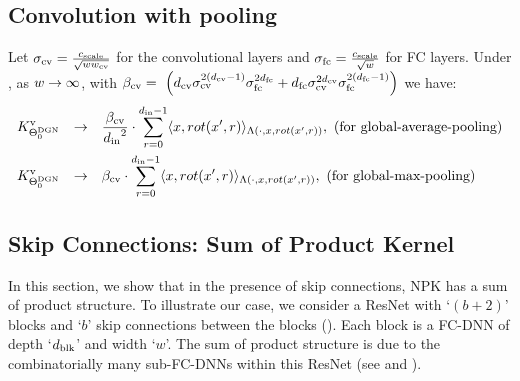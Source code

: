 \subsection{Convolution with pooling}

\begin{theorem}\label{th:mainconv} Let $\sigma_{\text{cv}}=\frac{c_{\text{scale}}}{\sqrt{ww_{\text{cv}}}}$ for the convolutional layers and $\sigma_{\text{fc}}=\frac{c_{\text{scale}}}{\sqrt{w}}$ for FC layers. Under , as $w\rightarrow\infty$, with  $\beta_{\text{cv}} = \ \left(d_{\text{cv}} \sigma_{\text{cv}}^{2(d_{\text{cv}}-1)}\sigma_{\text{fc}}^{2d_{\text{fc}}}+d_{\text{fc}} \sigma_{\text{cv}}^{2d_{\text{cv}}}\sigma_{\text{fc}}^{2(d_{\text{fc}}-1)}\right)$ we have:
\begin{align*}
&K^{\text{v}}_{\Theta^{\text{DGN}}_0}&\rightarrow&\quad \frac{\beta_{\text{cv}}}{{d_{\text{in}}}^2} \cdot \sum_{r=0}^{d_{\text{in}}-1} \langle x,rot(x',r)\rangle_{\Lambda(\cdot, x,rot(x',r))},\,\,\text{(for global-average-pooling)}\\
&K^{\text{v}}_{\Theta^{\text{DGN}}_0}&\rightarrow& \quad{\beta_{\text{cv}}} \cdot \sum_{r=0}^{d_{\text{in}}-1} \langle x,rot(x',r)\rangle_{\Lambda(\cdot, x,rot(x',r))},\,\,\text{(for global-max-pooling)}\\
\end{align*}
\end{theorem}


\subsection{Skip Connections: Sum of Product Kernel}\label{sec:res}
In this section, we show that in the presence of skip connections, NPK has a sum of product structure. To illustrate our case, we consider a ResNet with `$(b+2)$' blocks and `$b$' skip connections between the blocks (). Each block is a FC-DNN of depth `$d_{\text{blk}}$' and width `$w$'. The sum of product structure is due to the combinatorially many sub-FC-DNNs within this ResNet (see  and ).

